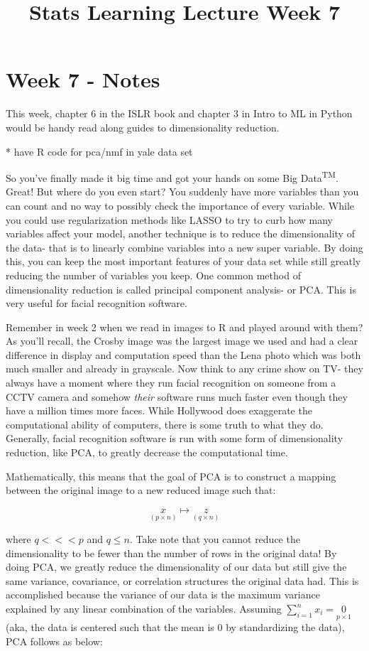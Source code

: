 \documentclass[a4paper]{article}
\title{Stats Learning Lecture Week 7}
\begin{document}
\section{Week 7 - Notes}

This week, chapter 6 in the ISLR book and chapter 3 in Intro to ML in Python would be handy read along guides to dimensionality reduction.

* have R code for pca/nmf in yale data set

So you've finally made it big time and got your hands on some Big Data\textsuperscript{TM}. Great! But where do you even start? You suddenly have more variables than you can count and no way to possibly check the importance of every variable. While you could use regularization methods like LASSO to try to curb how many variables affect your model, another technique is to reduce the dimensionality of the data- that is to linearly combine variables into a new super variable. By doing this, you  can keep the most important features of your data set while still greatly reducing the number of variables you keep. One common method of dimensionality reduction is called principal component analysis- or PCA. This is very useful for facial recognition software. 

Remember in week 2 when we read in images to R and played around with them? As you'll recall, the Crosby image was the largest image we used and had a clear difference in display and computation speed than the Lena photo which was both much smaller and already in grayscale. Now think to any crime show on TV- they always have a moment where they run facial recognition on someone from a CCTV camera and somehow \textit{their} software runs much faster even though they have a million times more faces. While Hollywood does exaggerate the computational ability of computers, there is some truth to what they do. Generally, facial recognition software is run with some form of dimensionality reduction, like PCA, to greatly decrease the computational time. 

Mathematically, this means that the goal of PCA is to construct a mapping between the original image to a new reduced image such that:

$$\underset{(p\times n)}{x} \mapsto \underset{(q\times n)}{z}$$

where $q<<<p$ and $q\leq n$. Take note that you cannot reduce the dimensionality to be fewer than the number of rows in the original data! By doing PCA, we greatly reduce the dimensionality of our data but still give the same variance, covariance, or correlation structures the original data had. This is accomplished because the variance of our data is the maximum variance explained by any linear combination of the variables. Assuming $\sum_{i=1}^{n}x_{i}=\underset{p\times 1}{0}$ (aka, the data is centered such that the mean is 0 by standardizing the data), PCA follows as below:
\end{document}
